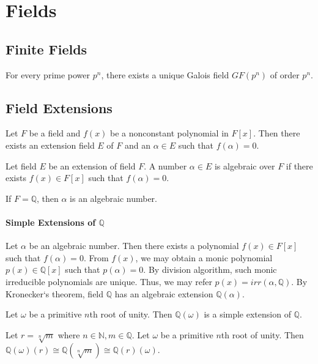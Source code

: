\section{Fields}
\subsection{Finite Fields}
\begin{definition}
	For every prime power $p^n$, there exists a unique Galois field $GF(p^n)$ of order $p^n$.
\end{definition}
\subsection{Field Extensions}
\begin{theorem}[Kronecker]
	Let $F$ be a field and $f(x)$ be a nonconstant polynomial in $F[x]$.
	Then there exists an extension field $E$ of $F$ and an $\alpha \in E$ such that $f(\alpha) = 0$.
\end{theorem}

\begin{definition}
	Let field $E$ be an extension of field $F$.
	A number $\alpha \in E$ is algebraic over $F$ if there exists $f(x) \in F[x]$ such that $f(\alpha) = 0$.
\end{definition}
	If $F = \mathbb{Q}$, then $\alpha$ is an algebraic number.

\paragraph{Simple Extensions of $\mathbb{Q}$}
	Let $\alpha$ be an algebraic number. Then there exists a polynomial $f(x) \in F[x]$ such that $f(\alpha) = 0$.
	From $f(x)$, we may obtain a monic polynomial $p(x) \in \mathbb{Q}[x]$ such that $p(\alpha) = 0$.
	By division algorithm, such monic irreducible polynomials are unique.
	Thus, we may refer $p(x) = irr(\alpha,\mathbb{Q})$.
	By Kronecker`s theorem, field $\mathbb{Q}$ has an algebraic extension $\mathbb{Q}(\alpha)$.
	
\par
	Let $\omega$ be a primitive $n$th root of unity. 
	Then $\mathbb{Q}(\omega)$ is a simple extension of $\mathbb{Q}$.

\par
	Let $r = \sqrt[n]{m}$ where $n \in \mathbb{N}, m \in \mathbb{Q}$.
	Let $\omega$ be a primitive $n$th root of unity.
	Then $\mathbb{Q}(\omega)(r) \cong \mathbb{Q}(\sqrt[n]{m}) \cong \mathbb{Q}(r)(\omega)$.

